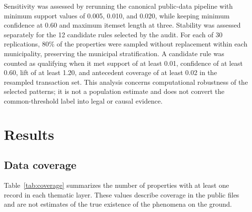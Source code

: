 \documentclass[11pt]{article}
\begin{document}
Sensitivity was assessed by rerunning the canonical public-data pipeline with minimum support values of 0.005, 0.010, and 0.020, while keeping minimum confidence at 0.60 and maximum itemset length at three. Stability was assessed separately for the 12 candidate rules selected by the audit. For each of 30 replications, 80\% of the properties were sampled without replacement within each municipality, preserving the municipal stratification. A candidate rule was counted as qualifying when it met support of at least 0.01, confidence of at least 0.60, lift of at least 1.20, and antecedent coverage of at least 0.02 in the resampled transaction set. This analysis concerns computational robustness of the selected patterns; it is not a population estimate and does not convert the common-threshold label into legal or causal evidence.

\section{Results}

\subsection{Data coverage}

Table~\ref{tab:coverage} summarizes the number of properties with at least one record in each thematic layer. These values describe coverage in the public files and are not estimates of the true existence of the phenomena on the ground.

\begin{table}[t]
\centering
\small
\caption{Coverage of public CAR thematic layers by property.}
\label{tab:coverage}
\end{table}
\end{document}
